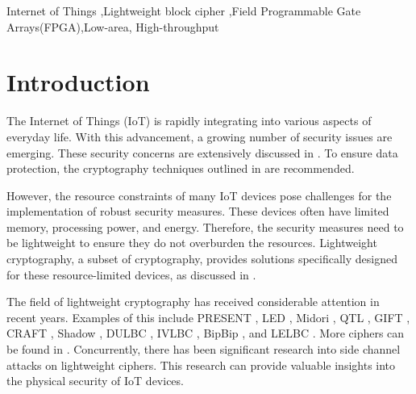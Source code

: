 \documentclass[final,5p,times,twocolumn]{elsarticle}
\begin{document}
\begin{frontmatter}
    \begin{keyword}
        Internet of Things  \sep Lightweight block cipher \sep Field Programmable Gate Arrays(FPGA)\sep  Low-area, High-throughput

    \end{keyword}

\end{frontmatter}




\section{Introduction}\label{sec1}

The Internet of Things (IoT) is rapidly integrating into various aspects of everyday life.
With this advancement, a growing number of security issues are emerging.
These security concerns are extensively discussed in \cite{Meneghello2019a}.
To ensure data protection, the cryptography techniques outlined in \cite{Swessi2022} are recommended.

However, the resource constraints of many IoT devices pose challenges for the implementation of robust security measures. These devices often have limited memory, processing power, and energy. Therefore, the security measures need to be lightweight to ensure they do not overburden the resources. Lightweight cryptography, a subset of cryptography, provides solutions specifically designed for these resource-limited devices, as discussed in \cite{Mohajerani2020}.

The field of lightweight cryptography has received considerable attention in recent years. Examples of this include PRESENT \cite{Bogdanov2007}, LED \cite{Guo2011}, Midori \cite{Banik2015a}, QTL \cite{Li2016}, GIFT \cite{Banik2017}, CRAFT \cite{Beierle2019}, Shadow \cite{Guo2021}, DULBC \cite{Yang2022}, IVLBC \cite{Huang2023}, BipBip \cite{Belkheyar2023}, and LELBC \cite{Song2024}. More ciphers can be found in \cite{Zakaria2023}. Concurrently, there has been significant research into side channel attacks on lightweight ciphers. This research can provide valuable insights into the physical security of IoT devices.
\end{document}
